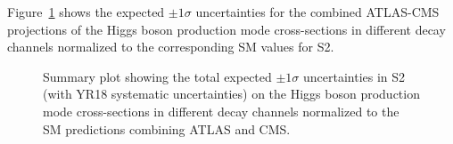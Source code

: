 Figure~\ref{fig:comb_5PD} shows the expected $\pm 1\sigma$ uncertainties for the combined ATLAS-CMS projections of the Higgs boson production mode cross-sections in different decay channels normalized to the corresponding SM values for S2.

\begin{figure}[hbtp]
\centering
\caption{Summary plot showing the total expected $\pm 1\sigma$ uncertainties in S2  (with YR18 systematic uncertainties) on the Higgs boson production mode cross-sections in different decay channels normalized to the SM predictions combining  ATLAS and CMS.}
\label{fig:comb_5PD}
\end{figure}
